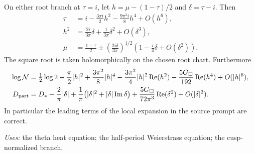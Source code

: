 \begin{proposition}\label{ari:C.3.1}
On either root branch at $\tau=i$, let
$h=\mu-(1-\tau)/2$ and $\delta=\tau-i$. Then
\begin{align*}
 \tau&=i-\frac{3\pi i}{2}h^2-\frac{9\pi^2i}{8}h^4+O(h^6),\\
 h^2&=\frac{2i}{3\pi}\delta+\frac1{3\pi}\delta^2+O(\delta^3),\\
 \mu&=\frac{1-\tau}{2}
  \mathbin{\pm}\left(\frac{2i\delta}{3\pi}\right)^{1/2}
          \left(1-\frac{i}{4}\delta+O(\delta^2)\right).
\end{align*}
The square root is taken holomorphically on the chosen root chart.
Furthermore
\begin{align}\label{ari:eq:cs-Li}
 \log \mathcal N={}&\tfrac12\log2-\frac\pi2|h|^2
   +\frac{3\pi^2}{8}|h|^4
   -\frac{3\pi^2}{4}|h|^2\operatorname{Re}(h^2)
   -\frac{5G_\square}{192}\operatorname{Re}(h^4)+O(|h|^6),\\
 D_{\rm part}={}&D_* -\frac2\pi|\delta|
  +\frac1\pi\bigl(|\delta|^2+|\delta|\operatorname{Im}\delta\bigr)
  +\frac{5G_\square}{72\pi^3}\operatorname{Re}(\delta^2)
  +O(|\delta|^3).\nonumber
\end{align}
In particular the leading terms of the local expansion in the source prompt are correct.
\end{proposition}
\noindent\textit{Uses:} the theta heat equation; the half-period Weierstrass equation; the cusp-normalized branch.\par
